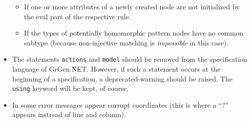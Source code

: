 \documentclass[12pt,a4paper]{article}
\begin{document}
\begin{itemize}
\begin{itemize}
			\item If one or more attributes of a newly created node are not initialized by the eval part of the respective rule.
			\item If the types of potentially homomorphic pattern nodes have no common subtype (because non-injective matching is \emph{impossible} in this case).
		\end{itemize}
	\item The statements {\tt actions} and {\tt model} should be removed from the specification language of GrGen.NET.
		However, if such a statement occurs at the beginning of a specification, a deprecated-warning should be raised.
		The {\tt using} keyword will be kept, of course.
	\item In some error messages appear corrupt coordinates (this is where a "`?"' appears instread of line and column).
\end{itemize}
\end{document}
